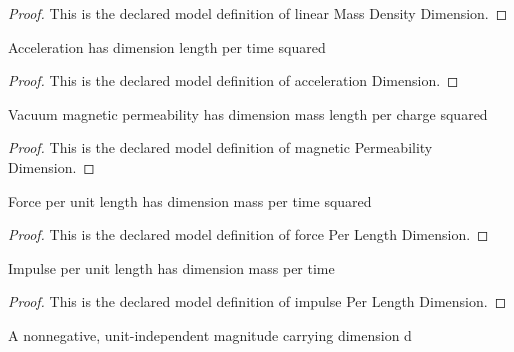 \begin{proof}
  This is the declared model definition of linear Mass Density Dimension.
\end{proof}
\begin{definition}
  \label{def:physics:phyx-mini-0971:phyxminiproblems-problemphyxmini0971-accelerationdimension}
  Acceleration has dimension length per time squared
\end{definition}
\begin{proof}
  This is the declared model definition of acceleration Dimension.
\end{proof}
\begin{definition}
  \label{def:physics:phyx-mini-0971:phyxminiproblems-problemphyxmini0971-magneticpermeabilitydimension}
  Vacuum magnetic permeability has dimension mass length per charge squared
\end{definition}
\begin{proof}
  This is the declared model definition of magnetic Permeability Dimension.
\end{proof}
\begin{definition}
  \label{def:physics:phyx-mini-0971:phyxminiproblems-problemphyxmini0971-forceperlengthdimension}
  Force per unit length has dimension mass per time squared
\end{definition}
\begin{proof}
  This is the declared model definition of force Per Length Dimension.
\end{proof}
\begin{definition}
  \label{def:physics:phyx-mini-0971:phyxminiproblems-problemphyxmini0971-impulseperlengthdimension}
  Impulse per unit length has dimension mass per time
\end{definition}
\begin{proof}
  This is the declared model definition of impulse Per Length Dimension.
\end{proof}
\begin{definition}[Magnitude]
  \label{def:physics:phyx-mini-0971:phyxminiproblems-problemphyxmini0971-magnitude}
  A nonnegative, unit-independent magnitude carrying dimension d
\end{definition}
